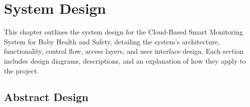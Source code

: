 \documentclass[12pt,a4paper]{report}
\begin{document}


\chapter{System Design}
This chapter outlines the system design for the Cloud-Based Smart Monitoring System for Baby Health and Safety, detailing the system's architecture, functionality, control flow, access layers, and user interface design. Each section includes design diagrams, descriptions, and an explanation of how they apply to the project.
\section{Abstract Design}
\end{document}

